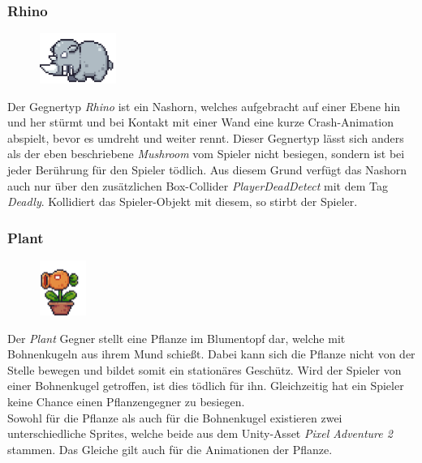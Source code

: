 \subsubsection*{Rhino}

\begin{figure}[H]
\includegraphics[width=25mm]{Figures/rhino.png}
\label{fig:rhino}
\end{figure}

Der Gegnertyp \textit{Rhino} ist ein Nashorn, welches aufgebracht auf einer Ebene hin und her stürmt und bei Kontakt mit einer Wand eine kurze Crash-Animation abspielt, bevor es umdreht und weiter rennt. Dieser Gegnertyp lässt sich anders als der eben beschriebene \textit{Mushroom} vom Spieler nicht besiegen, sondern ist bei jeder Berührung für den Spieler tödlich. Aus diesem Grund verfügt das Nashorn auch nur über den zusätzlichen Box-Collider \textit{PlayerDeadDetect} mit dem Tag \textit{Deadly}. Kollidiert das Spieler-Objekt mit diesem, so stirbt der Spieler.

\subsubsection*{Plant}

\begin{figure}[H]
\includegraphics[width=15mm]{Figures/plant.png}
\label{fig:plant}
\end{figure}

Der \textit{Plant} Gegner stellt eine Pflanze im Blumentopf dar, welche mit Bohnenkugeln aus ihrem Mund schießt. Dabei kann sich die Pflanze nicht von der Stelle bewegen und bildet somit ein stationäres Geschütz. Wird der Spieler von einer Bohnenkugel getroffen, ist dies tödlich für ihn. Gleichzeitig hat ein Spieler keine Chance einen Pflanzengegner zu besiegen.\\

Sowohl für die Pflanze als auch für die Bohnenkugel existieren zwei unterschiedliche Sprites, welche beide aus dem Unity-Asset \textit{Pixel Adventure 2} stammen. Das Gleiche gilt auch für die Animationen der Pflanze.\\

